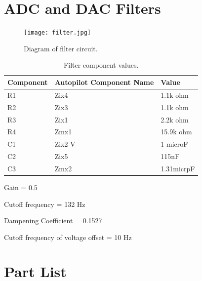 \documentclass[letterpaper,12pt]{report}
\begin{document}
\chapter{ADC and DAC Filters}
\begin{figure}[h]
	\centering
	\texttt{[image: filter.jpg]}
	\caption{Diagram of filter circuit.}
	\label{Figure 1:}
\end{figure}
\begin{table}[h]
	\centering
	\begin{tabular}{| l | l | l |}
 		\hline
 		Component & Autopilot Component Name & Value \\ \hline 
 		R1 & Zix4 & 1.1k ohm \\ \hline
 		R2 & Zix3 & 1.1k ohm \\ \hline
 		R3 & Zix1 & 2.2k ohm \\ \hline
 		R4 & Zmx1 & 15.9k ohm \\ \hline
 		C1 & Zix2 V & 1 microF \\ \hline
 		C2 & Zix5 & 115nF \\ \hline
 		C3 & Zmx2 & 1.31micrpF \\ \hline
 	
	\end{tabular}
	\caption{Filter component values.}
\end{table}

Gain = 0.5 \par
Cutoff frequency = 132 Hz \par
Dampening Coefficient = 0.1527 \par
Cutoff frequency of voltage offset = 10 Hz \par

\chapter{Part List}
\end{document}
